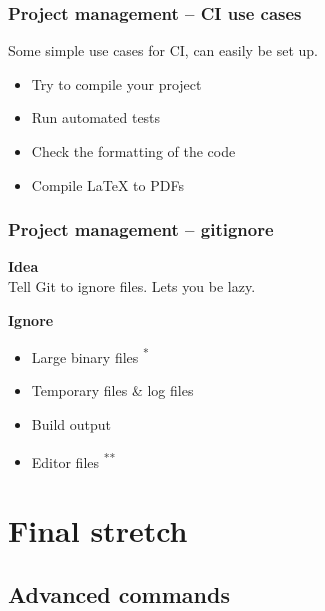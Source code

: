 \documentclass{beamer}
\newcommand{\keyword}[1]{\hspace{-1.0em}\textcolor{lkblue}{\textbf{#1}}\vspace{0.2em}} %
\begin{document}
\begin{frame}[fragile]
  \frametitle{Project management -- CI use cases} %

  Some simple use cases for CI, can easily be set up.
  \vspace{1em}
  \begin{itemize}
    \item Try to compile your project
    \item Run automated tests
    \item Check the formatting of the code
    \item Compile \LaTeX{} to PDFs
  \end{itemize}

\end{frame}

\begin{frame}[fragile]
  \frametitle{Project management -- gitignore}

  \keyword{Idea} \\
  Tell Git to ignore files. Lets you be lazy.
  \vspace{1em}

  \keyword{Ignore}
  \begin{itemize}
    \item<2-> Large binary files \textsuperscript{*}
    \item<3-> Temporary files \& log files
    \item<4-> Build output
    \item<5-> Editor files \textsuperscript{**}
  \end{itemize}
  \vspace{1em}

  \vspace{1em}

\end{frame}

\section{Final stretch}
\subsection{Advanced commands}
\end{document}

